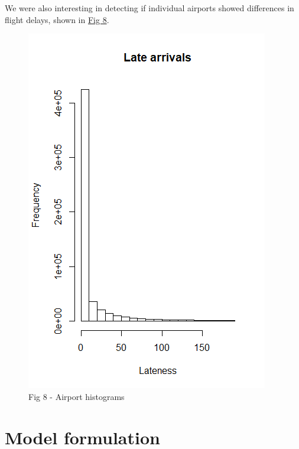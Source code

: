 \documentclass[12pt, a4paper]{book}
\newcommand\tab[1][1cm]{\hspace*{#1}}
\begin{document}
			\tab We were also interesting in detecting if individual airports showed differences in flight delays, shown in \underline{Fig 8}. 
			\begin{figure}[h]
	 		\includegraphics[width = 1 \textwidth]{../figures/LateArrivalsHistogram}
	 		\caption{Fig 8 - Airport histograms}
	 		\end{figure}
	 		
\chapter{Model formulation}
\end{document}
